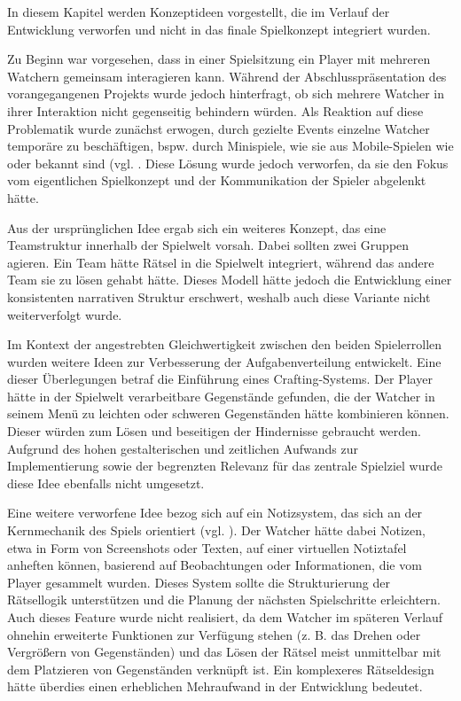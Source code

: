 In diesem Kapitel werden Konzeptideen vorgestellt, die im Verlauf der Entwicklung verworfen und nicht in das finale Spielkonzept integriert wurden.

Zu Beginn war vorgesehen, dass in einer Spielsitzung ein Player mit mehreren Watchern gemeinsam interagieren kann. Während der Abschlusspräsentation des vorangegangenen Projekts wurde jedoch hinterfragt, ob sich mehrere Watcher in ihrer Interaktion nicht gegenseitig behindern würden. Als Reaktion auf diese Problematik wurde zunächst erwogen, durch gezielte Events einzelne Watcher temporäre zu beschäftigen, bspw. durch Minispiele, wie sie aus Mobile-Spielen wie  oder  bekannt sind (vgl. \citealp{everbyte_duskwood_2019,jaunt_sentence_2019}. Diese Lösung wurde jedoch verworfen, da sie den Fokus vom eigentlichen Spielkonzept und der Kommunikation der Spieler abgelenkt hätte.

Aus der ursprünglichen Idee ergab sich ein weiteres Konzept, das eine Teamstruktur innerhalb der Spielwelt vorsah. Dabei sollten zwei Gruppen agieren. Ein Team hätte Rätsel in die Spielwelt integriert, während das andere Team sie zu lösen gehabt hätte. Dieses Modell hätte jedoch die Entwicklung einer konsistenten narrativen Struktur erschwert, weshalb auch diese Variante nicht weiterverfolgt wurde.

Im Kontext der angestrebten Gleichwertigkeit zwischen den beiden Spielerrollen wurden weitere Ideen zur Verbesserung der Aufgabenverteilung entwickelt. Eine dieser Überlegungen betraf die Einführung eines Crafting-Systems. Der Player hätte in der Spielwelt verarbeitbare Gegenstände gefunden, die der Watcher in seinem Menü zu leichten oder schweren Gegenständen hätte kombinieren können. Dieser würden zum Lösen und beseitigen der Hindernisse gebraucht werden. Aufgrund des hohen gestalterischen und zeitlichen Aufwands zur Implementierung sowie der begrenzten Relevanz für das zentrale Spielziel wurde diese Idee ebenfalls nicht umgesetzt.

Eine weitere verworfene Idee bezog sich auf ein Notizsystem, das sich an der Kernmechanik des Spiels  orientiert (vgl. \citealp{colepowered_games_shadows_2023}). Der Watcher hätte dabei Notizen, etwa in Form von Screenshots oder Texten, auf einer virtuellen Notiztafel anheften können, basierend auf Beobachtungen oder Informationen, die vom Player gesammelt wurden. Dieses System sollte die Strukturierung der Rätsellogik unterstützen und die Planung der nächsten Spielschritte erleichtern. Auch dieses Feature wurde nicht realisiert, da dem Watcher im späteren Verlauf ohnehin erweiterte Funktionen zur Verfügung stehen (z. B. das Drehen oder Vergrößern von Gegenständen) und das Lösen der Rätsel meist unmittelbar mit dem Platzieren von Gegenständen verknüpft ist. Ein komplexeres Rätseldesign hätte überdies einen erheblichen Mehraufwand in der Entwicklung bedeutet. 